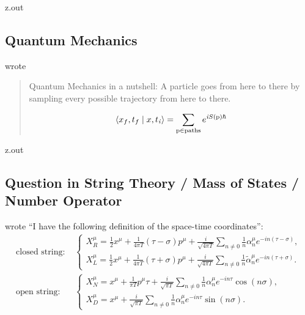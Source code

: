 \MyIO


\begin{VerbatimOut}{z.out}

\subsection{Quantum Mechanics}

\textcite{greene-2021-04-04}
wrote
\begin{quotation}
  Quantum Mechanics in a nutshell:
  A particle goes from here to there
  by sampling every possible trajectory from here to there.

  \[
    \langle x_f,t_f \mid x,t_{\mathit i} \rangle
    =
    \sum_{\text p \in \text{paths}} e^{\mathit iS(\text p) \si{\planckbar}}
  \]
\end{quotation}
\end{VerbatimOut}

\MyIO


\begin{VerbatimOut}{z.out}

\subsection{Question in String Theory / Mass of States / Number Operator}

\textcite{yourlazyphysicist2017}
wrote
``I have the following definition of the space-time coordinates'':
{
  \newcommand{\fpt}{{4\pi T}}
  \newcommand{\oh}{\frac12}
  \newcommand{\snnz}{\sum_{n\ne0}}
  \newcommand{\tms}{\tau - \sigma}
  \newcommand{\tps}{\tau + \sigma}
  \begin{align}
    \text{closed string: }&
      \begin{cases}
        \displaystyle
        X^\mu_R
          = \oh x^\mu
          + \frac1\fpt (\tms) p^\mu
          + \frac i{\sqrt\fpt} \snnz \frac1n \alpha^\mu_n e^{-in(\tms)},\\
        \displaystyle
        X^\mu_L
          = \oh x^\mu
          + \frac1\fpt (\tps) p^\mu
          + \frac i{\sqrt\fpt} \snnz \frac1n \tilde\alpha^\mu_n e^{-in(\tps)}.
      \end{cases}\\[6pt]
    \text{open string: }&
      \begin{cases}
        \displaystyle
        X^\mu_N
          = x^\mu
          + \frac1{\pi T}p^\mu\tau
          + \frac i{\sqrt{\pi T}} \snnz \frac1n \alpha^\mu_n e^{-in\tau} \cos(n\sigma),\\
        \displaystyle
        X^\mu_D
          = x^\mu
          + \frac i{\sqrt{\pi T}} \snnz \frac1n \alpha^\mu_n e^{-in\tau} \sin(n\sigma).
      \end{cases}
  \end{align}
}
\end{VerbatimOut}

